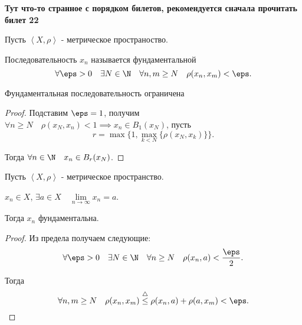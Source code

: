 
\textbf{Тут что-то странное с порядком билетов, рекомендуется сначала прочитать билет 22}

\begin{definition} \thmslashn 

    Пусть $\left<X, \rho\right>$ - метрическое пространоство.

    Последовательность $x_{n}$ называется фундаментальной
    \[ \forall{\eps > 0}\quad \exists{N\in \N}\quad \forall{n, m \ge  N}\quad \rho(x_{n}, x_{m}) < \eps  .\] 
\end{definition}

\begin{lemma} \thmslashn

    Фундаментальная последовательность ограничена

    \begin{proof} \thmslashn
    
        Подставим $\eps = 1$, получим $\forall{n \ge N}\quad \rho(x_{N}, x_{n}) < 1 \implies x_{n}\in B_{1}(x_{N})$, пусть 
        \[ r = \max \{1, \max\limits_{k < N} \{\rho(x_{N}, x_{k})\} \} .\]

        Тогда $\forall{n\in \N}\quad x_{n}\in B_{r}(x_{N})$.
    \end{proof}
\end{lemma}

\begin{lemma} \thmslashn

    Пусть $\left<X, \rho\right>$ - метрическое пространство.

    $x_{n}\in X$, $\exists{a\in X}\quad \lim\limits_{n \to \infty} x_{n} = a$.

    Тогда $x_{n}$ фундаментальна.

    \begin{proof} \thmslashn
    
        Из предела получаем следующие:
        \[ \forall{\eps > 0}\quad \exists{N\in \N}\quad \forall{n \ge N}\quad \rho(x_{n}, a) < \frac{\eps}{2} .\]

        Тогда
        \[ \forall{n, m \ge N}\quad \rho(x_{n}, x_{m}) \overset{\triangle}{\le} \rho(x_{n}, a) + \rho(a, x_{m}) < \eps .\] 
    \end{proof}
\end{lemma}

